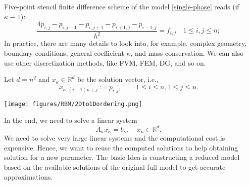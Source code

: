 \begin{figure}[!ht]
\begin{center}
\end{center}
\end{figure}

Five-point stencil finite difference scheme of the model \eqref{single-phase}
reads (if $\kappa \equiv 1$):  
$$
\frac{4p_{i,j}-p_{i,j-1}-p_{i,j+1}-p_{i+1,j}-p_{i-1,j}}{h^2}=f_{i,j} \quad 1 \le i,j \le n;
$$
In practice, there are many details to look into, for example, complex geometry, 
boundary conditions, general coefficient $\kappa$,  and mass conservation.
We can also use other discretization methods, like FVM, FEM, DG, and so on. 

Let $d=n^2$ and $x_{\kappa}\in \mathbb R^d$ be the solution vector, i.e., 
$$
x_{\kappa, (i-1)n+j} := p_{i,j}, \qquad 1 \le i \le n,  1 \le j \le n.
$$
\begin{center}
\texttt{[image: figures/RBM/2Dto1Dordering.png]}
\end{center}
In the end, we need to solve a linear system
\begin{equation}
A_{\kappa}x_{\kappa} = b_{\kappa},\quad  x_{\kappa}\in \mathbb{R}^d.
\end{equation}
We need to solve very large linear systems  and the computational cost is expensive.
Hence, we want to reuse the computed solutions to help obtaining solution for a new parameter.
The basic Idea is constructing a reduced model based on the available solutions of the original full model to get accurate approximations. 

